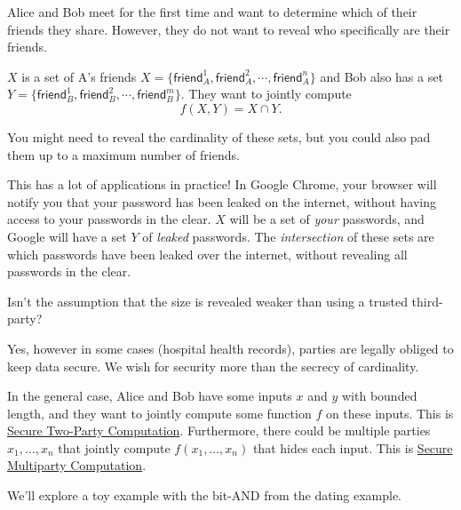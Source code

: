 \begin{example*}\label{ex:psi}
    Alice and Bob meet for the first time and want to determine which of their friends they share. However, they do not want to reveal who specifically are their friends.

    $X$ is a set of A's friends $X = \{\mathsf{friend}_A^1, \mathsf{friend}_A^2, \cdots, \mathsf{friend}_A^n\}$ and Bob also has a set $Y = \{\mathsf{friend}_B^1, \mathsf{friend}_B^2, \cdots, \mathsf{friend}_B^m\}$. They want to jointly compute \[f(X, Y) = X\cap Y.\]

    You might need to reveal the cardinality of these sets, but you could also pad them up to a maximum number of friends.

    This has a lot of applications in practice! In Google Chrome, your browser will notify you that your password has been leaked on the internet, without having access to your passwords in the clear. $X$ will be a set of \emph{your} passwords, and Google will have a set $Y$ of \emph{leaked} passwords. The \emph{intersection} of these sets are which passwords have been leaked over the internet, without revealing all passwords in the clear.
\end{example*}
\begin{ques*}
    Isn't the assumption that the size is revealed weaker than using a trusted third-party?

    Yes, however in some cases (hospital health records), parties are legally obliged to keep data secure. We wish for security more than the secrecy of cardinality.
\end{ques*}

In the general case, Alice and Bob have some inputs $x$ and $y$ with bounded length, and they want to jointly compute some function $f$ on these inputs. This is \ul{Secure Two-Party Computation}. Furthermore, there could be multiple parties $x_1, \dots, x_n$ that jointly compute $f(x_1, \dots, x_n)$ that hides each input. This is \ul{Secure Multiparty Computation}.

We'll explore a toy example with the bit-\textsf{AND} from the dating example.

